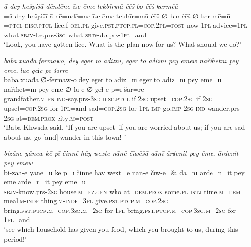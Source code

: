 \ea \label{BP.156}
\textit{ā dey hešpišā dēndēne īse ēme tekbīrmā čēš bo čēš kermēū} \\ 
\gll =ā dey hešpišī-ā dē=ndē=ne īse ēme tekbīr=mā čēš ∅-b-o čēš ∅-ker-mē=ū \\ 
=\textsc{ptcl} \textsc{disc.ptcl} lice.f\textsc{-obl}\textsc{.pl} give\textsc{.pst}\textsc{.ptcp}\textsc{.pl}\textsc{=cop}.\textsc{2pl}\textsc{=\textsc{post}} now \textsc{1pl} advice\textsc{=\textsc{1pl}} what \textsc{sbjv-}be.prs\textsc{-3sg} what \textsc{sbjv-}do.prs\textsc{-\textsc{1pl}}=and \\ 
\glt `Look, you have gotten lice. What is the plan now for us? What should we do?'
\z 
 
\ea \label{BP.160}
\textit{bābā xuāđā fermāwo, dey eger to ādiznī, eger to ādiznī pey ēmew nāřihetnī pey ēme, lue gēɫe pī šārre} \\ 
\gll bābā xuāđā ∅-fermāw-o dey eger to ādiz=nī eger to ādiz=nī pey ēme=ū nāřihet=nī pey ēme ∅-lu-e ∅-gēɫ-e p=ī šār=re \\ 
 grandfather\textsc{.m} \textsc{pn} \textsc{ind-}say.prs\textsc{-3sg} \textsc{disc.ptcl} if \textsc{2sg} upset\textsc{=cop}\textsc{.\textsc{2sg}} if \textsc{2sg} upset\textsc{=cop}\textsc{.\textsc{2sg}} for \textsc{1pl}=and sad\textsc{=cop}\textsc{.\textsc{2sg}} for \textsc{1pl} \textsc{imp-}go.\textsc{imp-}\textsc{2sg} \textsc{ind-}wander.prs-\textsc{2sg} at=\textsc{dem.prox} city\textsc{.m}\textsc{=\textsc{post}} \\ 
\glt `Baba Khwada said, ‘If you are upset; if you are worried about us; if you are sad about us, go [and] wander in this town! '
\z 
 
\ea \label{BP.161}
\textit{bizāne yānew kē pī činnē hāy wexte nānē čīwēšā dānī ārdenit pey ēme, ārdenit pey ēmew} \\ 
\gll bi-zān-e yāne=ū kē p=ī činnē hāy wext=e nān-ē čīw-ē=šā dā=nī ārde=n=it pey ēme ārde=n=it pey ēme=ū \\ 
 \textsc{sbjv-}know.prs-\textsc{2sg} house\textsc{.m}\textsc{=ez.gen} who at=\textsc{dem.prox} some\textsc{.pl} \textsc{intj} time\textsc{.m}\textsc{=dem} meal\textsc{.m}\textsc{-indf} thing\textsc{.m}\textsc{-indf}\textsc{=3pl} give\textsc{.pst}\textsc{.ptcp}\textsc{.m}\textsc{=cop}\textsc{.\textsc{2sg}} bring\textsc{.pst}\textsc{.ptcp}\textsc{.m}\textsc{=cop}\textsc{.3sg}\textsc{.m}\textsc{=\textsc{2sg}} for \textsc{1pl} bring\textsc{.pst}\textsc{.ptcp}\textsc{.m}\textsc{=cop}\textsc{.3sg}\textsc{.m}\textsc{=\textsc{2sg}} for \textsc{1pl}=and \\ 
\glt `see which household has given you food, which you brought to us, during this period!'
\z 
 
